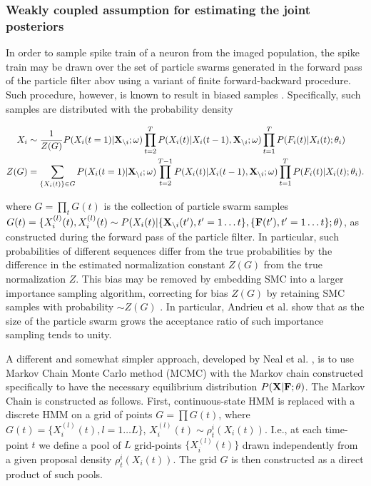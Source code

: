 \subsubsection{Weakly coupled assumption for estimating the joint posteriors}

In order to sample spike train of a neuron from the imaged population, the spike train may be drawn over the set of particle swarms generated in the forward pass of the particle filter abov using a variant of finite forward-backward procedure.  Such procedure, however, is known to result in biased samples \cite{Andrieu2007, NBR03}.
Specifically, such samples are distributed with the probability density

\begin{align}
X_i &\sim \frac{1}{Z(G)} P(X_i(t=1)|{\bf X}_{\backslash i}; \mathbf{\omega})\prod\limits_{t=2}^{T}P(X_i(t)|X_i(t-1), {\bf X}_{\backslash i}; \mathbf{\omega}) \prod_{t=1}^{T} P(F_i(t)|X_i(t); \mathbf{\theta}_i) \\
Z(G) &= \sum_{\{X_i(t)\}\in G} P(X_i(t=1)|{\bf X}_{\backslash i}; \mathbf{\omega}) \prod_{t=2}^{T-1}P(X_i(t)|X_i(t-1), {\bf X}_{\backslash i}; \mathbf{\omega}) \prod_{t=1}^{T}P(F_i(t)|X_i(t); \mathbf{\theta}_i).
\end{align}

\noindent where $G=\prod\limits_t G(t)$ is the collection of particle swarm samples $G(t)=\{X_i^{(l)}(t), X_i^{(l)}(t) \sim P(X_i(t)|\{{\bf X}_{\backslash i}(t'),t'=1\ldots t\},\{{\bf F}(t'),t'=1\ldots t\};\theta)$, as constructed during the forward pass of the particle filter.  In particular, such probabilities of different sequences differ from the true probabilities by the difference in the estimated normalization constant $Z(G)$ from the true normalization $Z$.  This bias may be removed by embedding SMC into a larger importance sampling algorithm, correcting for bias $Z(G)$ by retaining SMC samples with probability $\sim Z(G)$ \cite{Andrieu2007}. In particular, Andrieu et al. \cite{Andrieu2007} show that as the size of the particle swarm grows the acceptance ratio of such importance sampling tends to unity.

A different and somewhat simpler approach, developed by Neal et al. \cite{NBR03}, is to use Markov Chain Monte Carlo method (MCMC) with the Markov chain constructed specifically to have the necessary equilibrium distribution $P({\bf X}| {\bf F}; \theta)$. The Markov Chain is constructed as follows. First, continuous-state HMM is replaced with a discrete HMM on a grid of points $G=\prod G(t)$, where $G(t) = \{X_i^{(l)}(t), l=1\ldots L\}$, $X_i^{(l)}(t)\sim \rho^i_t(X_i(t))$. I.e., at each time-point $t$ we define a pool of $L$ grid-points $\{X_i^{(l)}(t)\}$ drawn independently from a given proposal density $\rho^i_t(X_i(t))$. The grid $G$ is then constructed as a direct product of such pools.

